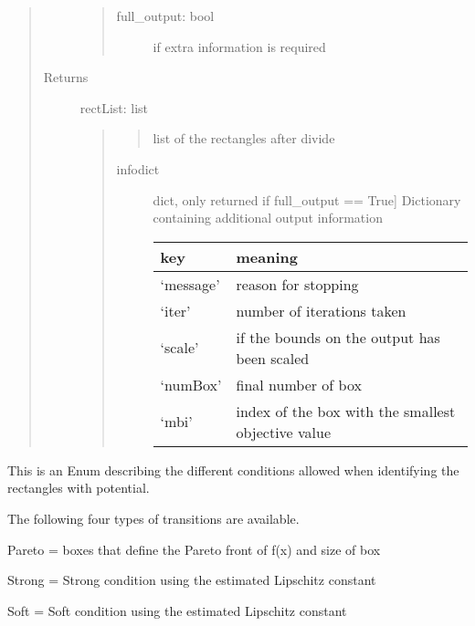 \documentclass[letterpaper,10pt,english]{sphinxmanual}
\begin{document}
\begin{fulllineitems}
\begin{quote}
\begin{description}
\begin{quote}
\begin{description}
\item[{full\_output: bool}] \leavevmode
if extra information is required

\end{description}
\end{quote}

\item[{Returns}] \leavevmode
rectList: list
\begin{quote}
\begin{quote}

list of the rectangles after divide
\end{quote}
\begin{description}
\item[{infodict}] \leavevmode{[}dict, only returned if full\_output == True{]}
Dictionary containing additional output information

\begin{tabulary}{\linewidth}{|L|L|}
\hline
\textsf{\relax 
key
} & \textsf{\relax 
meaning
}\\
\hline
`message'
 & 
reason for stopping
\\
\hline
`iter'
 & 
number of iterations taken
\\
\hline
`scale'
 & 
if the bounds on the output has been scaled
\\
\hline
`numBox'
 & 
final number of box
\\
\hline
`mbi'
 & 
index of the box with the smallest objective
value
\\
\hline\end{tabulary}


\end{description}
\end{quote}

\end{description}\end{quote}

\end{fulllineitems}



\begin{fulllineitems}
This is an Enum describing the different conditions allowed when identifying
the rectangles with potential.

The following four types of transitions are available.

Pareto = boxes that define the Pareto front of f(x) and size of box

Strong = Strong condition using the estimated Lipschitz constant

Soft = Soft condition using the estimated Lipschitz constant

\end{fulllineitems}
\end{document}
